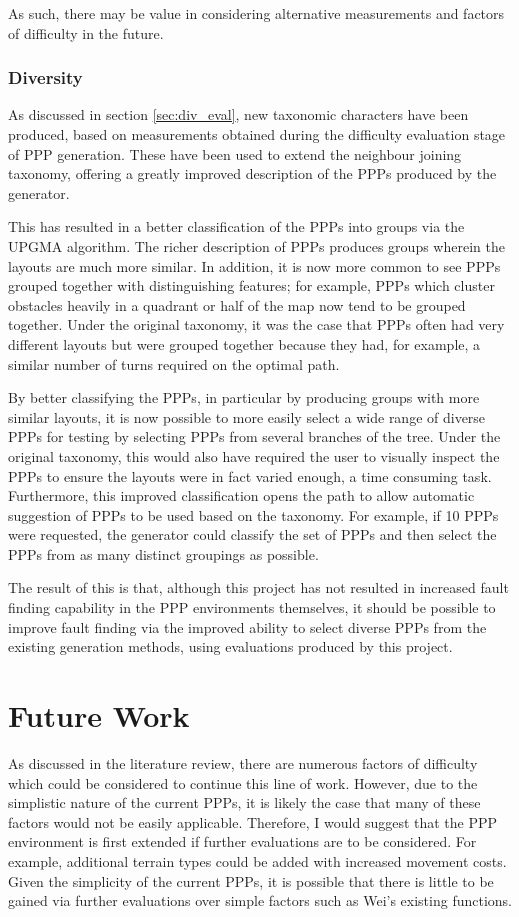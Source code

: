 \documentclass[authoryearcitations]{UoYCSproject}
\begin{document}
As such, there may be value in considering alternative measurements and factors of difficulty in the future.

\subsection{Diversity}
\label{sec:conc_div}

As discussed in section \ref{sec:div_eval}, new taxonomic characters have been produced, based on measurements obtained during the difficulty evaluation stage of PPP generation. These have been used to extend the neighbour joining taxonomy, offering a greatly improved description of the PPPs produced by the generator.

This has resulted in a better classification of the PPPs into groups via the UPGMA algorithm. The richer description of PPPs produces groups wherein the layouts are much more similar. In addition, it is now more common to see PPPs grouped together with distinguishing features; for example, PPPs which cluster obstacles heavily in a quadrant or half of the map now tend to be grouped together. Under the original taxonomy, it was the case that PPPs often had very different layouts but were grouped together because they had, for example, a similar number of turns required on the optimal path.

By better classifying the PPPs, in particular by producing groups with more similar layouts, it is now possible to more easily select a wide range of diverse PPPs for testing by selecting PPPs from several branches of the tree. Under the original taxonomy, this would also have required the user to visually inspect the PPPs to ensure the layouts were in fact varied enough, a time consuming task. Furthermore, this improved classification opens the path to allow automatic suggestion of PPPs to be used based on the taxonomy. For example, if 10 PPPs were requested, the generator could classify the set of PPPs and then select the PPPs from as many distinct groupings as possible.

The result of this is that, although this project has not resulted in increased fault finding capability in the PPP environments themselves, it should be possible to improve fault finding via the improved ability to select diverse PPPs from the existing generation methods, using evaluations produced by this project.

\chapter{Future Work}
\label{cha:futWork}
As discussed in the literature review, there are numerous factors of difficulty which could be considered to continue this line of work. However, due to the simplistic nature of the current PPPs, it is likely the case that many of these factors would not be easily applicable. Therefore, I would suggest that the PPP environment is first extended if further evaluations are to be considered. For example, additional terrain types could be added with increased movement costs. Given the simplicity of the current PPPs, it is possible that there is little to be gained via further evaluations over simple factors such as Wei's existing functions.
\end{document}
